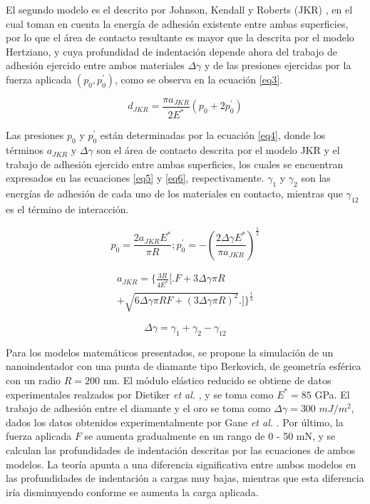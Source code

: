 \documentclass[final,6p,times,twocolumn]{elsarticle}
\begin{document}
El segundo modelo es el descrito por Johnson, Kendall y Roberts (JKR) \cite{JKR}, en el cual toman en cuenta la energ\'ia de adhesi\'on existente entre ambas superficies, por lo que el \'area de contacto resultante es mayor que la descrita por el modelo Hertziano, y cuya profundidad de indentaci\'on depende ahora del trabajo de adhesi\'on ejercido entre ambos materiales $\Delta\gamma$ y de las presiones ejercidas por la fuerza aplicada $(p_0, p^\prime_0)$, como se observa en la ecuaci\'on \ref{eq3}.

\begin{equation}\label{eq3}
    d_{JKR}=\frac{\pi a_{JKR}}{2E^*}\left( p_0 + 2p^\prime_0 \right)
\end{equation}

Las presiones $p_0$ y $p^\prime_0$ est\'an determinadas por la ecuaci\'on \ref{eq4}, donde los t\'erminos $a_{JKR}$ y $\Delta\gamma$ son el \'area de contacto descrita por el modelo JKR y el trabajo de adhesi\'on ejercido entre ambas superficies, los cuales se encuentran expresados en las ecuaciones \ref{eq5} y \ref{eq6}, respectivamente. $\gamma_1$ y $\gamma_2$ son las energ\'ias de adhesi\'on de cada uno de los materiales en contacto, mientras que $\gamma_{12}$ es el t\'ermino de interacci\'on.

\begin{equation}\label{eq4}
    p_0 = \frac{2a_{JKR} E^*}{\pi R} ; p^\prime_0 = -\left( \frac{2\Delta\gamma E^*}{\pi a_{JKR}} \right)^\frac{1}{2}
\end{equation}

\begin{multline}\label{eq5}
a_{JKR} = \Bigg\{ \frac{3R}{4E^*} \Bigg[ \Bigg. F + 3\Delta\gamma\pi{R} \\
+ \sqrt{6\Delta\gamma\pi{R}{F} + (3\Delta\gamma\pi{R})^2} \Bigg. \Bigg] \Bigg\}^\frac{1}{3}
\end{multline}

\begin{equation}\label{eq6}
    \Delta\gamma = \gamma_1 + \gamma_2 - \gamma_{12}
\end{equation}

Para los modelos matem\'aticos presentados, se propone la simulaci\'on de un nanoindentador con una punta de diamante tipo Berkovich, de geometr\'ia esf\'erica con un radio $R=200$ nm. El m\'odulo el\'astico reducido se obtiene de datos experimentales realzados por Dietiker \textit{et al.} \cite{DIETIKER2008}, y se toma como $E^* = 85$ GPa. El trabajo de adhesi\'on entre el diamante y el oro se toma como $\Delta\gamma = 300$ $mJ/m^2$, dados los datos obtenidos experimentalmente por Gane \textit{et al.} \cite{GANE1974}. Por \'ultimo, la fuerza aplicada $F$ se aumenta gradualmente en un rango de 0 - 50 mN, y se calculan las profundidades de indentaci\'on descritas por las ecuaciones de ambos modelos. La teor\'ia apunta a una diferencia significativa entre ambos modelos en las profundidades de indentaci\'on a cargas muy bajas, mientras que esta diferencia ir\'ia disminuyendo conforme se aumenta la carga aplicada.
\end{document}
